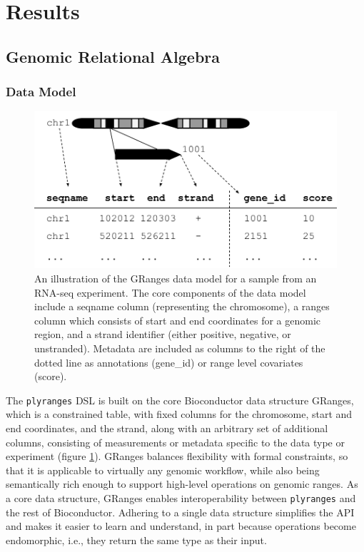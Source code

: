 \documentclass[]{article}
\begin{document}
\hypertarget{results}{%
\section{Results}\label{results}}

\hypertarget{genomic-relational-algebra}{%
\subsection{Genomic Relational
Algebra}\label{genomic-relational-algebra}}

\hypertarget{data-model}{%
\subsubsection{Data Model}\label{data-model}}

\begin{figure}
\includegraphics[width=\textwidth]{diagrams/GRanges}
\caption{An illustration of the GRanges data model for a
sample from an RNA-seq experiment. The core components of the data model
include a seqname column (representing the chromosome), a ranges column
which consists of start and end coordinates for a genomic region, and a
strand identifier (either positive, negative, or unstranded). Metadata
are included as columns to the right of the dotted line as annotations
(gene\_id) or range level covariates (score).}
\label{fig:GRanges} 
\end{figure}

The \texttt{plyranges} DSL is built on the core Bioconductor data
structure GRanges, which is a constrained table, with fixed columns for
the chromosome, start and end coordinates, and the strand, along with an
arbitrary set of additional columns, consisting of measurements or
metadata specific to the data type or experiment (figure
\ref{fig:GRanges}). GRanges balances flexibility with formal
constraints, so that it is applicable to virtually any genomic workflow,
while also being semantically rich enough to support high-level
operations on genomic ranges. As a core data structure, GRanges enables
interoperability between \texttt{plyranges} and the rest of
Bioconductor. Adhering to a single data structure simplifies the API and
makes it easier to learn and understand, in part because operations
become endomorphic, i.e., they return the same type as their input.
\end{document}
